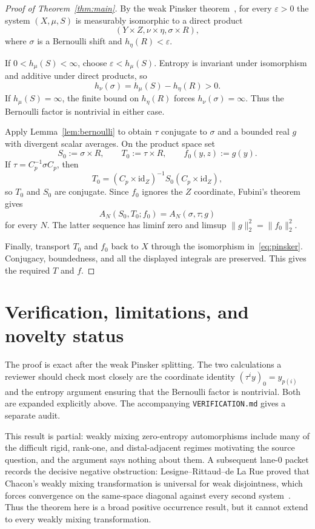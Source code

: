 \documentclass[11pt]{article}
\begin{document}
\begin{proof}[Proof of Theorem~\ref{thm:main}]
By the weak Pinsker theorem~\cite{AustinPinsker}, for every $\varepsilon>0$
the system $(X,\mu,S)$ is measurably isomorphic to a direct product
\begin{equation}\label{eq:pinsker}
 (Y\times Z,\nu\times\eta,\sigma\times R),
\end{equation}
where $\sigma$ is a Bernoulli shift and $h_\eta(R)<\varepsilon$.

If $0<h_\mu(S)<\infty$, choose $\varepsilon<h_\mu(S)$.  Entropy is invariant
under isomorphism and additive under direct products, so
\[
 h_\nu(\sigma)=h_\mu(S)-h_\eta(R)>0.
\]
If $h_\mu(S)=\infty$, the finite bound on $h_\eta(R)$ forces
$h_\nu(\sigma)=\infty$.  Thus the Bernoulli factor is nontrivial in either
case.

Apply Lemma~\ref{lem:bernoulli} to obtain $\tau$ conjugate to $\sigma$ and a
bounded real $g$ with divergent scalar averages.  On the product space set
\[
 S_0:=\sigma\times R,
 \qquad T_0:=\tau\times R,
 \qquad f_0(y,z):=g(y).
\]
If $\tau=C_p^{-1}\sigma C_p$, then
\[
 T_0=(C_p\times\mathrm{id}_Z)^{-1}S_0
     (C_p\times\mathrm{id}_Z),
\]
so $T_0$ and $S_0$ are conjugate.  Since $f_0$ ignores the $Z$ coordinate,
Fubini's theorem gives
\[
 A_N(S_0,T_0;f_0)=A_N(\sigma,\tau;g)
\]
for every $N$.  The latter sequence has liminf zero and limsup
$\|g\|_2^2=\|f_0\|_2^2$.

Finally, transport $T_0$ and $f_0$ back to $X$ through the isomorphism
in~\eqref{eq:pinsker}.  Conjugacy, boundedness, and all the displayed
integrals are preserved.  This gives the required $T$ and $f$.
\end{proof}

\section{Verification, limitations, and novelty status}

The proof is exact after the weak Pinsker splitting.  The two calculations a
reviewer should check most closely are the coordinate identity
$(\tau^iy)_0=y_{p(i)}$ and the entropy argument ensuring that the Bernoulli
factor is nontrivial.  Both are expanded explicitly above.  The accompanying
\texttt{VERIFICATION.md} gives a separate audit.

This result is partial: weakly mixing zero-entropy automorphisms include many
of the difficult rigid, rank-one, and distal-adjacent regimes motivating the
source question, and the argument says nothing about them.  A subsequent
lane-0 packet records the decisive negative obstruction: Lesigne--Rittaud--de
La Rue proved that Chacon's weakly mixing transformation is universal for weak
disjointness, which forces convergence on the same-space diagonal against
every second system~\cite[Proposition~4.2]{LRR}.  Thus the theorem here is a broad positive occurrence
result, but it cannot extend to every weakly mixing transformation.
\end{document}
